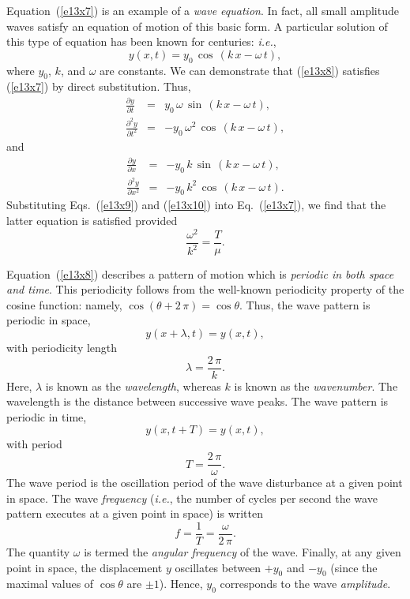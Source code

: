 Equation~(\ref{e13x7}) is an example of a {\em wave equation}. In fact,
all small amplitude waves satisfy an equation of motion of this basic form. A particular solution of
this type of equation has been known for centuries: {\em i.e.}, 
\begin{equation}\label{e13x8}
y(x,t) = y_0\,\cos\,(k\,x - \omega \,t),
\end{equation}
where $y_0$, $k$, and $\omega$ are constants. We can demonstrate that (\ref{e13x8}) satisfies
(\ref{e13x7}) by direct substitution. Thus,
\begin{eqnarray}
\frac{\partial y}{\partial t} &=& y_0\,\omega\,\sin\,(k\,x - \omega \,t),\\[0.5ex]
\frac{\partial^2 y}{\partial t^2} &=& -y_0\,\omega^2\,\cos\,(k\,x - \omega \,t),\label{e13x9}
\end{eqnarray}
and
\begin{eqnarray}
\frac{\partial y}{\partial x} &=& -y_0\,k\,\sin\,(k\,x - \omega \,t),\\[0.5ex]
\frac{\partial^2 y}{\partial x^2} &=& -y_0\,k^2\,\cos\,(k\,x - \omega \,t).\label{e13x10}
\end{eqnarray}
Substituting Eqs.~(\ref{e13x9}) and (\ref{e13x10}) into Eq.~(\ref{e13x7}), we find that the
latter equation is satisfied provided 
\begin{equation}\label{e13xx}
\frac{\omega^2}{k^2} = \frac{T}{\mu}.
\end{equation}

Equation~(\ref{e13x8}) describes a pattern of motion which is {\em periodic in both space and time}.
This periodicity follows from the well-known periodicity property of the cosine function:
namely,
$\cos(\theta+2\,\pi)=\cos\theta$. Thus, the wave pattern is periodic in space,
\begin{equation}
y (x+\lambda,t) = y(x,t),
\end{equation}
with periodicity length 
\begin{equation}\label{e13x11}
\lambda = \frac{2\,\pi}{k}.
\end{equation}
Here, $\lambda$ is known as the {\em wavelength}, whereas $k$ is known as the {\em wavenumber}. 
The wavelength is the distance between successive wave peaks.
The wave pattern is periodic in time,
\begin{equation}
y (x,t+T) = y(x,t),
\end{equation}
with period 
\begin{equation}
T = \frac{2\,\pi}{\omega}.
\end{equation}
The wave period is the oscillation period of the wave disturbance at a given point in space.
The wave {\em frequency} ({\em i.e.}, the number of cycles per second the wave pattern executes
at a given point in space) is written
\begin{equation}\label{e13x12}
f = \frac{1}{T} = \frac{\omega}{2\,\pi}.
\end{equation}
The quantity $\omega$ is termed the {\em angular frequency}
 of the wave. Finally, at any given point in space, the displacement $y$ oscillates
between $+y_0$ and $-y_0$ (since the maximal values of $\cos\theta$ are $\pm 1$).
Hence, $y_0$ corresponds to the wave {\em amplitude}.

